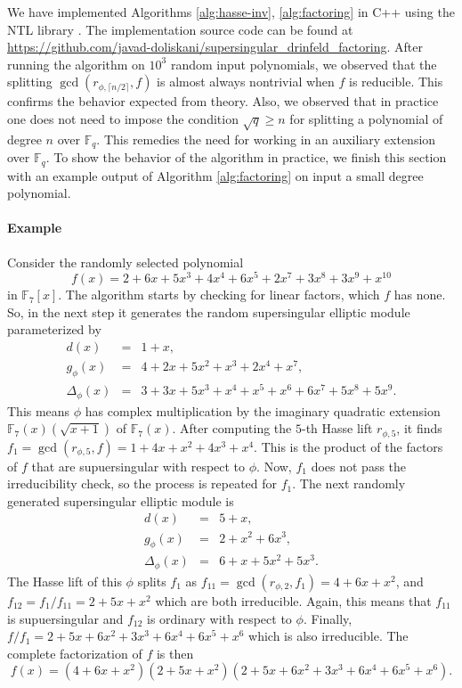 \documentclass[12pt]{article}
\theoremstyle{plain}
\theoremstyle{definition}
\def\F{\ensuremath{\mathbb{F}}}
\begin{document}
We have implemented Algorithms \ref{alg:hasse-inv}, \ref{alg:factoring} in C++ using the NTL 
library \cite{shoup2001ntl}. The implementation source code can be found at 
\url{https://github.com/javad-doliskani/supersingular_drinfeld_factoring}. After running the 
algorithm on $10^3$ random input polynomials, we observed that the splitting $\gcd(r_{\phi, \lceil 
n / 2 \rceil}, f)$ is almost always nontrivial when $f$ is reducible. This confirms the behavior 
expected from theory. Also, we observed that in practice one does not need to impose the condition 
$\sqrt{q} \ge n$ for splitting a polynomial of degree $n$ over $\F_q$. This remedies the need for 
working in an auxiliary extension over $\F_q$. To show the behavior of the algorithm in practice, 
we finish this section with an example output of Algorithm \ref{alg:factoring} on input a 
small degree polynomial.

\paragraph{Example}
Consider the randomly selected polynomial 
\[ f(x) = 2 + 6x + 5x^3 + 4x^4 + 6x^5 + 2x^7 + 3x^8 + 3x^9 + x^{10} \]
in $\F_7[x]$. The algorithm starts by checking for linear factors, which $f$ has none. So, in the 
next step it generates the random supersingular elliptic module parameterized by
\[
\begin{array}{rll}
	d(x) & = & 1 + x, \\
	g_\phi(x) & = & 4 + 2x + 5x^2 + x^3 + 2x^4 + x^7, \\
	\Delta_\phi(x) & = & 3 + 3x + 5x^3 + x^4 + x^5 + x^6 + 6x^7 + 5x^8 + 5x^9.
\end{array}
\]
This means $\phi$ has complex multiplication by the imaginary quadratic extension $\F_7(x)(\sqrt{x 
+ 1})$ of $\F_7(x)$. After computing the $5$-th Hasse lift $r_{\phi, 5}$, it finds $f_1 = 
\gcd(r_{\phi, 5}, f) = 1 + 4x + x^2 + 4x^3 + x^4$. This is the product of the factors of $f$ that 
are supuersingular with respect to $\phi$. Now, $f_1$ does not pass the irreducibility check, so 
the process is repeated for $f_1$. The next randomly generated supersingular elliptic module is
\[
\begin{array}{rll}
	d(x) & = & 5 + x, \\
	g_\phi(x) & = & 2 + x^2 + 6x^3, \\
	\Delta_\phi(x) & = & 6 + x + 5x^2 + 5x^3.
\end{array}
\]
The Hasse lift of this $\phi$ splits $f_1$ as $f_{11} = \gcd(r_{\phi, 2}, f_1) = 4 + 6x + x^2$, and 
$f_{12} = f_1 / f_{11} = 2 + 5x + x^2$ which are both irreducible. Again, this means that $f_{11}$ 
is supuersingular and $f_{12}$ is ordinary with respect to $\phi$. Finally, $f / f_1 = 2 + 5x + 
6x^2 + 3x^3 + 6x^4 + 6x^5 + x^6$ which is also irreducible. The complete factorization of $f$ is 
then \[ f(x) = (4 + 6x + x^2)(2 + 5x + x^2)(2 + 5x + 6x^2 + 3x^3 + 6x^4 + 6x^5 + x^6).\]




\end{document}
